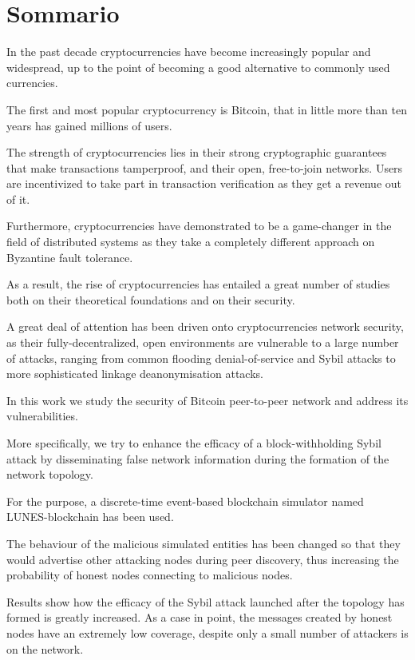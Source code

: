 \chapter*{Sommario} %
\label{sommario}

In the past decade cryptocurrencies have become increasingly popular and widespread, up to the point of becoming a good alternative to commonly used currencies.

The first and most popular cryptocurrency is Bitcoin, that in little more than ten years has gained millions of users.

The strength of cryptocurrencies lies in their strong cryptographic guarantees that make transactions tamperproof, and their open, free-to-join networks. Users are incentivized to take part in transaction verification as they get a revenue out of it.
 
Furthermore, cryptocurrencies have demonstrated to be a game-changer in the field of distributed systems as they take a completely different approach on Byzantine fault tolerance.

As a result, the rise of cryptocurrencies has entailed a great number of studies both on their theoretical foundations and on their security.

A great deal of attention has been driven onto cryptocurrencies network security, as their fully-decentralized, open environments are vulnerable to a large number of attacks, ranging from common flooding denial-of-service and Sybil attacks to more sophisticated linkage deanonymisation attacks.

In this work we study the security of Bitcoin peer-to-peer network and address its vulnerabilities.

More specifically, we try to enhance the efficacy of a block-withholding Sybil attack by disseminating false network information during the formation of the network topology. 

For the purpose, a discrete-time event-based blockchain simulator named LUNES-blockchain has been used.

The behaviour of the malicious simulated entities has been changed so that they would advertise other attacking nodes during peer discovery, thus increasing the probability of honest nodes connecting to malicious nodes.

Results show how the efficacy of the Sybil attack launched after the topology has formed is greatly increased. As a case in point, the messages created by honest nodes have an extremely low coverage, despite only a small number of attackers is on the network. 

